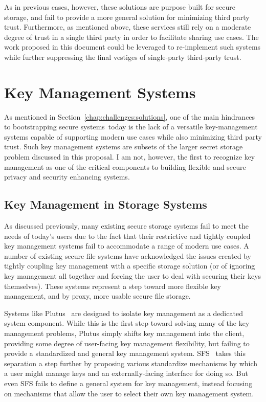 As in previous cases, however, these solutions are purpose built for
secure storage, and fail to provide a more general solution for
minimizing third party trust. Furthermore, as mentioned above, these
services still rely on a moderate degree of trust in a single third
party in order to facilitate sharing use cases. The work proposed in
this document could be leveraged to re-implement such systems while
further suppressing the final vestiges of single-party third-party
trust.

\section{Key Management Systems}
\label{chap:related:keymgmt}

As mentioned in Section~\ref{chap:challenges:solutions}, one of the
main hindrances to bootstrapping secure systems\ today is the lack of
a versatile key-management systems capable of supporting modern use
cases while also minimizing third party trust. Such key management
systems are subsets of the larger secret storage problem discussed in
this proposal. I am not, however, the first to recognize key
management as one of the critical components to building flexible and
secure privacy and security enhancing systems.

\subsection{Key Management in Storage Systems}

As discussed previously, many existing secure storage systems fail to
meet the needs of today's users due to the fact that their restrictive
and tightly coupled key management systems fail to accommodate a range
of modern use cases. A number of existing secure file systems have
acknowledged the issues created by tightly coupling key management
with a specific storage solution (or of ignoring key management all
together and forcing the user to deal with securing their keys
themselves). These systems represent a step toward more flexible key
management, and by proxy, more usable secure file storage.

Systems like Plutus~\cite{kallahalla2003} are designed to isolate key
management as a dedicated system component. While this is the first
step toward solving many of the key management problems, Plutus simply
shifts key management into the client, providing some degree of
user-facing key management flexibility, but failing to provide a
standardized and general key management
system. SFS~\cite{mazieres1999} takes this separation a step further
by proposing various standardize mechanisms by which a user might
manage keys and an externally-facing interface for doing so. But even
SFS fails to define a general system for key management, instead
focusing on mechanisms that allow the user to select their own key
management system.

